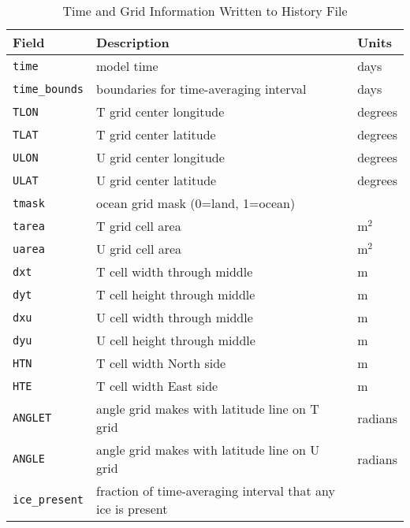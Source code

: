 \begin{table}
  \begin{center}
  \leavevmode
  \caption{Time and Grid Information Written to History File}
   \label{table:time_grid_hist}
   \begin{tabular}{lll} \hline
Field          & Description                        & Units         \\
\hline \hline
{\tt time}      & model time                     & days            \\
{\tt time\_bounds} & boundaries for time-averaging interval  & days  \\
{\tt TLON}      & T grid center longitude        & degrees         \\
{\tt TLAT}      & T grid center latitude         & degrees         \\
{\tt ULON}      & U grid center longitude        & degrees         \\
{\tt ULAT}      & U grid center latitude         & degrees         \\
{\tt tmask}     & ocean grid mask (0=land, 1=ocean)&                 \\
{\tt tarea}     & T grid cell area               & m$^{2}$         \\
{\tt uarea}     & U grid cell area               & m$^{2}$         \\
{\tt dxt}       & T cell width through middle    & m               \\
{\tt dyt}       & T cell height through middle   & m               \\
{\tt dxu}       & U cell width through middle    & m               \\
{\tt dyu}       & U cell height through middle   & m               \\
{\tt HTN}       & T cell width North side        & m               \\
{\tt HTE}       & T cell width East side         & m               \\
{\tt ANGLET}    & angle grid makes with latitude line on T grid & radians \\
{\tt ANGLE}     & angle grid makes with latitude line on U grid & radians \\
{\tt ice\_present} & fraction of time-averaging interval that any ice is present& \\
\hline
  \end{tabular}
  \end{center}
\end{table}


